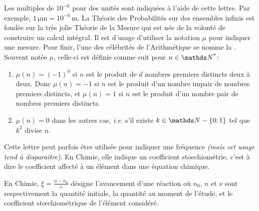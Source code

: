 \cadre{$\mu$} Les multiples de $10^{-6}$ pour des unités sont indiquées à l'aide de cette lettre. Par exemple, $1 \, \si{\micro\metre} = 10^{-6} \, \si{\metre}$.
La Théorie des Probabilités sur des ensembles infinis est fondée sur la très jolie Théorie de la Mesure qui est née de la volonté de construire un calcul intégral. Il est d'usage d'utiliser la notation $\mu$ pour indiquer une mesure.
Pour finir, l'une des célébrités de l'Arithmétique se nomme la . Souvent notée $\mu$, celle-ci est définie comme suit pour $n \in \NNs$:
\begin{enumerate}
	\renewcommand{\labelitemi}{$\bullet$}

	\item $\mu(n) = (-1)^d$ si $n$ est le produit de $d$ nombres premiers distincts deux à deux. Donc $\mu(n) = -1$ si $n$ est le produit d'un nombre impair de nombres premiers distincts, et $\mu(n) = 1$ si $n$ est le produit d'un nombre pair de nombres premiers distincts.
	
	\item $\mu(n) = 0$ dans les autres cas, \textit{i.e.} s'il existe $k \in \NN - \{0 ; 1\}$ tel que $k^2$ divise $n$.
\end{enumerate}

\cadre{$\nu$} Cette lettre peut parfois être utilisée pour indiquer une fréquence \emph{(mais cet usage tend à disparaître)}. En Chimie, elle indique un coefficient stoechiométrie, c'est à dire le coefficient affecté à un élément dans une équation chimique.

\cadre{$\xi$} En Chimie, $\xi = \frac{n - n_0}{\nu}$  désigne l'avancement d'une réaction où $n_0$, $n$ et $\nu$ sont respectivement la quantité initiale, la quantité au moment de l'étude, et le coefficient stœchiométrique de l'élément considéré.

